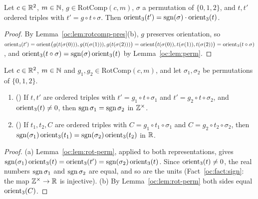 \begin{lemma}\label{oc:lem:rot-perm}
Let $c\in\mathbb R^2$, $m\in\mathbb N$, $g\in\mathrm{RotComp}(c,m)$, $\sigma$ a permutation of $\{0,1,2\}$, and $t,t'$
ordered triples with $t'=g\circ t\circ\sigma$. Then $\operatorname{orient}_3(t')=\operatorname{sgn}(\sigma)\cdot\operatorname{orient}_3(t)$.
\end{lemma}
\begin{proof}
By Lemma~\ref{oc:lem:rotcomp-pres}(b), $g$ preserves orientation, so
$\operatorname{orient}_3(t')=\operatorname{orient}\bigl(g(t(\sigma(0))),g(t(\sigma(1))),g(t(\sigma(2)))\bigr)
=\operatorname{orient}\bigl(t(\sigma(0)),t(\sigma(1)),t(\sigma(2))\bigr)=\operatorname{orient}_3(t\circ\sigma)$, and
$\operatorname{orient}_3(t\circ\sigma)=\operatorname{sgn}(\sigma)\operatorname{orient}_3(t)$ by Lemma~\ref{oc:lem:perm}.
\end{proof}

\begin{lemma}\label{oc:lem:two-reps}
Let $c\in\mathbb R^2$, $m\in\mathbb N$ and $g_1,g_2\in\mathrm{RotComp}(c,m)$, and let $\sigma_1,\sigma_2$ be permutations
of $\{0,1,2\}$.
\begin{enumerate}[label=(\alph*)]
\item () If $t,t'$ are ordered triples with $t'=g_1\circ t\circ\sigma_1$ and
  $t'=g_2\circ t\circ\sigma_2$, and $\operatorname{orient}_3(t)\ne0$, then $\operatorname{sgn}\sigma_1=\operatorname{sgn}\sigma_2$ in $\mathbb Z^\times$.
\item () If $t_1,t_2,C$ are ordered triples with $C=g_1\circ t_1\circ\sigma_1$
  and $C=g_2\circ t_2\circ\sigma_2$, then $\operatorname{sgn}(\sigma_1)\operatorname{orient}_3(t_1)=\operatorname{sgn}(\sigma_2)\operatorname{orient}_3(t_2)$ in
  $\mathbb R$.
\end{enumerate}
\end{lemma}
\begin{proof}
(a) Lemma~\ref{oc:lem:rot-perm}, applied to both representations, gives
$\operatorname{sgn}(\sigma_1)\operatorname{orient}_3(t)=\operatorname{orient}_3(t')=\operatorname{sgn}(\sigma_2)\operatorname{orient}_3(t)$. Since $\operatorname{orient}_3(t)\ne0$, the real
numbers $\operatorname{sgn}\sigma_1$ and $\operatorname{sgn}\sigma_2$ are equal, and so are the units (Fact~\ref{oc:fact:sign}: the
map $\mathbb Z^\times\to\mathbb R$ is injective). (b) By Lemma~\ref{oc:lem:rot-perm} both sides equal $\operatorname{orient}_3(C)$.
\end{proof}

